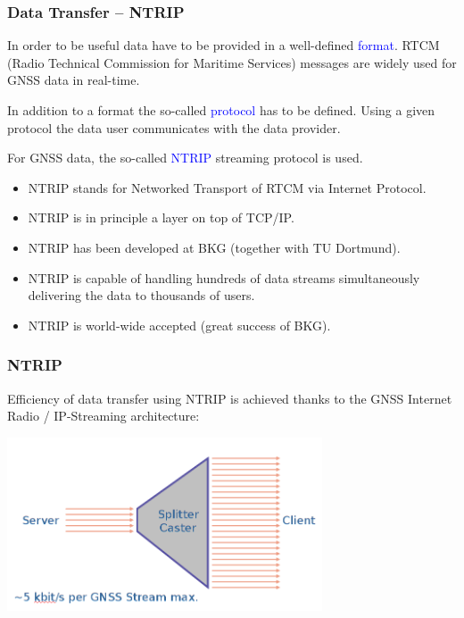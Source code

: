 \documentclass[10pt]{beamer}
\begin{document}
\begin{frame}
\frametitle{Data Transfer -- NTRIP}

In order to be useful data have to be provided in a well-defined \textcolor{blue}{format}.
RTCM (Radio Technical Commission for Maritime Services) messages are widely used for GNSS data in
real-time. 

\vspace*{5mm}

In addition to a format the so-called \textcolor{blue}{protocol} has to be defined. Using a given
protocol the data user communicates with the data provider.

For GNSS data, the so-called \textcolor{blue}{NTRIP} streaming protocol is used.
\begin{itemize}
\item NTRIP stands for Networked Transport of RTCM via Internet Protocol.
\item NTRIP is in principle a layer on top of TCP/IP.
\item NTRIP has been developed at BKG (together with TU Dortmund).
\item NTRIP is capable of handling hundreds of data streams simultaneously delivering the data
to thousands of users.
\item NTRIP is world-wide accepted (great success of BKG).
\end{itemize}

\end{frame}


\begin{frame}
\frametitle{NTRIP}

Efficiency of data transfer using NTRIP is achieved thanks to the GNSS Internet Radio /
IP-Streaming architecture:

\begin{center}
\includegraphics[width=0.7\textwidth,angle=0]{ntrip.png}
\end{center}

\end{frame}
\end{document}
